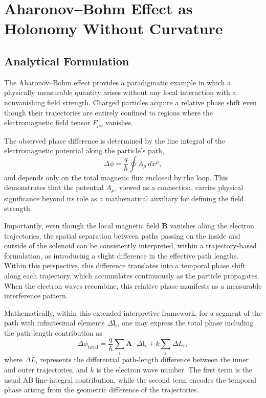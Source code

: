 \documentclass[%
 reprint,
 amsmath,amssymb,
 aps,
 prb,
]{revtex4-2}
\numberwithin{equation}{section}
\begin{document}
\section{Aharonov--Bohm Effect as Holonomy Without Curvature}
\label{sec:ab_holonomy_without_curvature}

\subsection{Analytical Formulation}
\label{sec:ab_analytical_formulation}

The Aharonov--Bohm effect provides a paradigmatic example in which a physically measurable quantity arises without any local interaction with a nonvanishing field strength. Charged particles acquire a relative phase shift even though their trajectories are entirely confined to regions where the electromagnetic field tensor $F_{\mu\nu}$ vanishes.

The observed phase difference is determined by the line integral of the electromagnetic potential along the particle's path,
\begin{equation}
\Delta \phi = \frac{q}{\hbar} \oint A_\mu \, dx^\mu,
\label{eq:ab_phase}
\end{equation}
and depends only on the total magnetic flux enclosed by the loop. This demonstrates that the potential $A_\mu$, viewed as a connection, carries physical significance beyond its role as a mathematical auxiliary for defining the field strength.

Importantly, even though the local magnetic field \( \mathbf{B} \) vanishes along the electron trajectories, the spatial separation between paths passing on the inside and outside of the solenoid can be consistently interpreted, within a trajectory-based formulation, as introducing a slight difference in the effective path lengths. Within this perspective, this difference translates into a temporal phase shift along each trajectory, which accumulates continuously as the particle propagates. When the electron waves recombine, this relative phase manifests as a measurable interference pattern.

Mathematically, within this extended interpretive framework, for a segment of the path with infinitesimal elements \( \Delta \mathbf{l}_i \), one may express the total phase including the path-length contribution as
\begin{equation}
\Delta \phi_\mathrm{total} = \frac{q}{\hbar} \sum_i \mathbf{A} \cdot \Delta \mathbf{l}_i + k \sum_i \Delta L_i,
\end{equation}
where \( \Delta L_i \) represents the differential path-length difference between the inner and outer trajectories, and \( k \) is the electron wave number. The first term is the usual AB line-integral contribution, while the second term encodes the temporal phase arising from the geometric difference of the trajectories.
\end{document}
